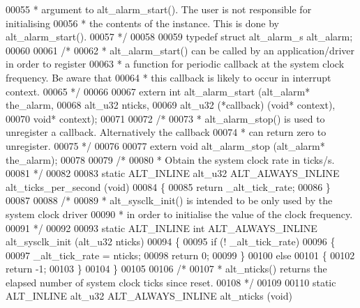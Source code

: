 \begin{DoxyCode}
00055 \textcolor{comment}{ * argument to alt\_alarm\_start(). The user is not responsible for initialising}
00056 \textcolor{comment}{ * the contents of the instance. This is done by alt\_alarm\_start(). }
00057 \textcolor{comment}{ */}
00058 
00059 \textcolor{keyword}{typedef} \textcolor{keyword}{struct }alt_alarm_s alt_alarm;
00060 
00061 \textcolor{comment}{/* }
00062 \textcolor{comment}{ * alt\_alarm\_start() can be called by an application/driver in order to register}
00063 \textcolor{comment}{ * a function for periodic callback at the system clock frequency. Be aware that}
00064 \textcolor{comment}{ * this callback is likely to occur in interrupt context. }
00065 \textcolor{comment}{ */}
00066 
00067 \textcolor{keyword}{extern} \textcolor{keywordtype}{int} alt_alarm_start (alt_alarm* the\_alarm, 
00068                             alt_u32    nticks, 
00069                             alt_u32    (*callback) (\textcolor{keywordtype}{void}* context),
00070                             \textcolor{keywordtype}{void}*      context);
00071 
00072 \textcolor{comment}{/*}
00073 \textcolor{comment}{ * alt\_alarm\_stop() is used to unregister a callback. Alternatively the callback }
00074 \textcolor{comment}{ * can return zero to unregister.}
00075 \textcolor{comment}{ */}
00076 
00077 \textcolor{keyword}{extern} \textcolor{keywordtype}{void} alt_alarm_stop (alt_alarm* the\_alarm);
00078 
00079 \textcolor{comment}{/*}
00080 \textcolor{comment}{ * Obtain the system clock rate in ticks/s. }
00081 \textcolor{comment}{ */}
00082 
00083 \textcolor{keyword}{static} ALT_INLINE alt_u32 ALT_ALWAYS_INLINE alt_ticks_per_second (\textcolor{keywordtype}{void})
00084 \{
00085   \textcolor{keywordflow}{return} _alt_tick_rate;
00086 \}
00087 
00088 \textcolor{comment}{/*}
00089 \textcolor{comment}{ * alt\_sysclk\_init() is intended to be only used by the system clock driver}
00090 \textcolor{comment}{ * in order to initialise the value of the clock frequency.}
00091 \textcolor{comment}{ */}
00092 
00093 \textcolor{keyword}{static} ALT_INLINE \textcolor{keywordtype}{int} ALT_ALWAYS_INLINE alt_sysclk_init (alt_u32 nticks)
00094 \{
00095   \textcolor{keywordflow}{if} (! _alt_tick_rate)
00096   \{
00097     _alt_tick_rate = nticks;
00098     \textcolor{keywordflow}{return} 0;
00099   \}
00100   \textcolor{keywordflow}{else}
00101   \{
00102     \textcolor{keywordflow}{return} -1;
00103   \}
00104 \}
00105 
00106 \textcolor{comment}{/*}
00107 \textcolor{comment}{ * alt\_nticks() returns the elapsed number of system clock ticks since reset.}
00108 \textcolor{comment}{ */}
00109 
00110 \textcolor{keyword}{static} ALT_INLINE alt_u32 ALT_ALWAYS_INLINE alt_nticks (\textcolor{keywordtype}{void})

\end{DoxyCode}
